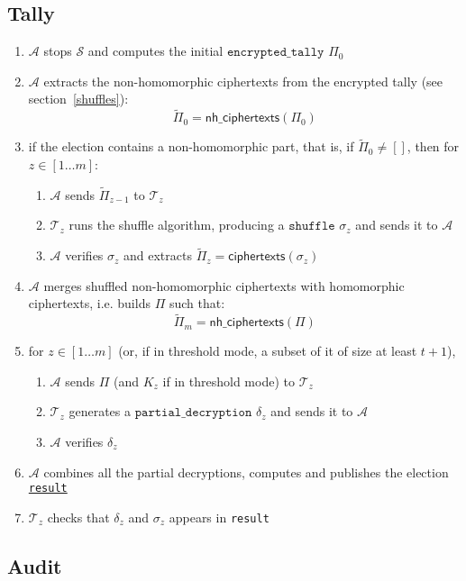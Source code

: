 \documentclass[a4paper]{article}
\newcommand{\etally}{\texttt{encrypted\_tally}}
\newcommand{\pdecryption}{\texttt{partial\_decryption}}
\newcommand{\result}{\texttt{result}}
\begin{document}
\subsection{Tally}

\begin{enumerate}
\item $\mathcal{A}$ stops $\mathcal{S}$ and computes the initial
  \hyperref[tally]{$\etally$} $\Pi_0$
\item $\mathcal{A}$ extracts the non-homomorphic ciphertexts from the
  encrypted tally (see
  section~\ref{shuffles}):
  \[\tilde\Pi_0=\textsf{nh\_ciphertexts}(\Pi_0)\]
\item if the election contains a non-homomorphic part, that is, if
  $\tilde\Pi_0\neq []$,
 then for $z\in[1\dots m]$:
  \begin{enumerate}
  \item $\mathcal{A}$ sends $\tilde\Pi_{z-1}$ to $\mathcal{T}_z$
  \item $\mathcal{T}_z$ runs the shuffle algorithm, producing a
    \hyperref[shuffles]{$\texttt{shuffle}$} $\sigma_z$ and sends it to
    $\mathcal{A}$
  \item $\mathcal{A}$ verifies $\sigma_z$ and extracts
    $\tilde\Pi_z=\textsf{ciphertexts}(\sigma_z)$
  \end{enumerate}
\item $\mathcal{A}$ merges shuffled non-homomorphic ciphertexts with
  homomorphic ciphertexts, i.e. builds $\Pi$ such
  that:\[\tilde\Pi_m=\textsf{nh\_ciphertexts}(\Pi)\]
\item for $z\in[1\dots m]$ (or, if in threshold mode, a subset of it
  of size at least $t+1$),
  \begin{enumerate}
  \item $\mathcal{A}$ sends $\Pi$ (and $K_z$ if in threshold mode) to
    $\mathcal{T}_z$
  \item $\mathcal{T}_z$ generates a \hyperref[tally]{$\pdecryption$} $\delta_z$
    and sends it to $\mathcal{A}$
  \item $\mathcal{A}$ verifies $\delta_z$
  \end{enumerate}
\item $\mathcal{A}$ combines all the partial decryptions, computes and publishes
  the election \hyperref[election-result]{\result}
\item $\mathcal{T}_z$ checks that $\delta_z$ and $\sigma_z$ appears in
  {\result}
\end{enumerate}

\subsection{Audit}
\end{document}

